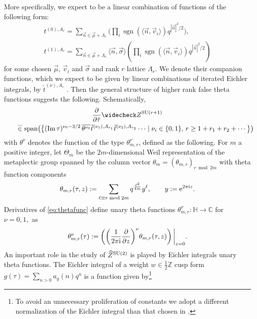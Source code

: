 \documentclass[10pt,a4paper]{amsart}
\def\BZ{\mathbb{Z}}
\newcommand{\CC}{\mathbb{C}}
\newcommand{\HH}{\mathbb{H}}
\theoremstyle{definition}
\numberwithin{equation}{section}
\begin{document}
More specifically, we expect  to be a linear combination of functions of the following form:
\begin{gather*}
t_{}^{(0),A_r}= \sum_{\vec n\in \vec\mu + \Lambda_r} \Biggr(\prod_{i}\operatorname{sgn}(\langle \vec n, \vec v_i\rangle) q^{|\vec n|^2/2}\Biggl), \\
 t_{}^{(1),A_r}= \sum_{\vec n\in \vec\mu + \Lambda_r}\langle \vec n, \vec \sigma\rangle \left(\prod_{i}\operatorname{sgn}(\langle \vec n, \vec v_i\rangle) q^{|\vec n|^2/2}\right)
\end{gather*}
for some chosen $\vec \mu$, $\vec v_i$ and $\vec \sigma$ and rank $r$ lattice $\Lambda_r$. We denote their companion functions, which we expect to be given by linear combinations of iterated Eichler integrals, by $\check t^{(\nu),A_r}_{}$ \cite{Bringmann:2021dxg}. Then the general structure of higher rank false theta functions suggests the following. Schematically,
\begin{gather}
 {\frac{\partial}{\partial \bar \tau}}
 {\widecheck Z}^{{\rm SU}(r+1)}\nonumber\\
 \qquad\stackrel{\dots}{\in}\operatorname{span}\bigl(\bigl\{ (\operatorname{Im}\tau)^{\nu_0-3/2}\,\overline{\theta^{\nu_0} }
 \check t^{(\nu_1),A_{r_1}} \check t^{(\nu_2),A_{r_2}} \cdots \mid \nu_i\in \{0,1\},\,r\geq 1+r_1+r_2+\cdots \bigr\}\bigr)\!\!\!\label{general_recursion}
\end{gather}
with $\theta^{\nu}$ denotes the function of the type $\theta^\nu_{m,r}$, defined as the following. For $m$ a positive integer, let $\Theta_m$ be the $2m$-dimensional Weil
representation of the metaplectic group \smash{$\widetilde{{\rm SL}_2(\BZ)}$} spanned by the column
vector $\theta_m=(\theta_{m,r})_{r \bmod 2m}$ with theta function components
\begin{equation}
\label{eq:thetafunc}
 \theta_{m,r}(\tau,z) := \sum_{\ell \equiv r\bmod 2m}
 q^{\frac{\ell^2}{4m}} y^\ell, \qquad y:={\rm e}^{2\pi\mathrm{i}z} .
\end{equation}
Derivatives of \eqref{eq:thetafunc} define unary theta functions $\theta^\nu_{m,r}\colon \HH\to \CC$ for $\nu=0,1,$ as
\begin{equation}\label{dfn:theta}
 \theta^\nu_{m,r}(\tau) := \left(\left({\frac{1}{ 2\pi {\rm i}}} \frac{\partial}{\partial z}\right)^{\nu} \!\theta_{m,r}(\tau,z) \right)\bigg\lvert_{z=0}.
\end{equation}
An important role in the study of $\widehat Z^{{\rm SU}(2)}$ is played by Eichler integrals unary theta functions. The Eichler integral of a weight $w\in \tfrac{1}{2}{\mathbb Z}$ cusp form $g(\tau)=\sum_{n>0}a_g(n) q^n$ is a function given by\footnote{To avoid an unnecessary proliferation of constants we adopt a different normalization of the Eichler integral than that chosen in \cite{cheng20193d}.}
\end{document}
